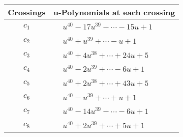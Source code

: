 \documentclass[1p]{elsarticle_modified}
\theoremstyle{definition}
\begin{document}
\begin{tabular}{m{50pt}|m{274pt}}
Crossings & \hspace{64pt}u-Polynomials at each crossing \\
\hline $$\begin{aligned}c_{1}\end{aligned}$$&$\begin{aligned}
&u^{40}-17 u^{39}+\cdots-15 u+1
\end{aligned}$\\
\hline $$\begin{aligned}c_{2}\end{aligned}$$&$\begin{aligned}
&u^{40}+u^{39}+\cdots- u+1
\end{aligned}$\\
\hline $$\begin{aligned}c_{3}\end{aligned}$$&$\begin{aligned}
&u^{40}+4 u^{38}+\cdots+24 u+5
\end{aligned}$\\
\hline $$\begin{aligned}c_{4}\end{aligned}$$&$\begin{aligned}
&u^{40}-2 u^{39}+\cdots-6 u+1
\end{aligned}$\\
\hline $$\begin{aligned}c_{5}\end{aligned}$$&$\begin{aligned}
&u^{40}+2 u^{38}+\cdots+43 u+5
\end{aligned}$\\
\hline $$\begin{aligned}c_{6}\end{aligned}$$&$\begin{aligned}
&u^{40}- u^{39}+\cdots+u+1
\end{aligned}$\\
\hline $$\begin{aligned}c_{7}\end{aligned}$$&$\begin{aligned}
&u^{40}-14 u^{39}+\cdots-6 u+1
\end{aligned}$\\
\hline $$\begin{aligned}c_{8}\end{aligned}$$&$\begin{aligned}
&u^{40}+2 u^{39}+\cdots+5 u+1
\end{aligned}$\\

\end{tabular}
\end{document}
